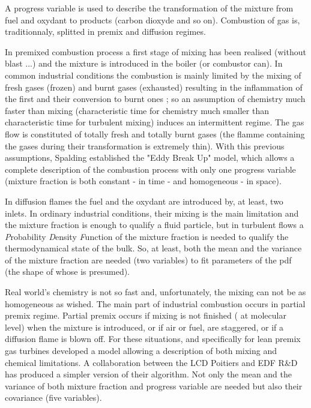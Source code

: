 A progress variable is used to describe the transformation of the mixture from
fuel and oxydant to products (carbon dioxyde and so on).
Combustion of gas is, traditionnaly, splitted in premix and diffusion regimes.

In premixed combustion process a first stage of mixing has been realised
(without blast ...) and the mixture is introduced in the boiler (or combustor
can). In common industrial conditions the combustion is mainly limited by the
mixing of fresh gases (frozen) and burnt gases (exhausted) resulting in the
inflammation of the first and their conversion to burnt ones ; so an assumption
of chemistry much faster than mixing (characteristic time for chemistry much
smaller than characteristic time for turbulent mixing) induces an intermittent
regime. The gas flow is constituted of totally fresh and totally burnt gases
(the flamme containing the gases during their transformation is extremely
thin). With this previous assumptions, Spalding \cite{Spalding:1971a} established the "Eddy
Break Up" model, which allows a complete description of the combustion process
with only one progress variable (mixture fraction is both constant
- in time - and homogeneous - in space).

In diffusion flames the fuel and the oxydant are introduced by, at least, two
inlets. In ordinary industrial conditions, their mixing is the main limitation
and the mixture fraction is enough to qualify a fluid particle, but in turbulent
flows a {\em P}robability {\em D}ensity {\em F}unction of the mixture fraction
is needed to qualify the thermodynamical state of the bulk. So, at least, both
the mean and the variance of the mixture fraction are needed (two variables) to
fit parameters of the pdf (the shape of whose is presumed).

Real world's chemistry is not so fast and, unfortunately, the mixing can not be
as homogeneous as wished. The main part of industrial combustion occurs in
partial premix regime. Partial premix occurs if mixing is not finished ( at
molecular level) when the mixture is introduced, or if air or fuel, are
staggered, or if a diffusion flame is blown off. For these situations, and
specifically for lean premix gas turbines \cite{Libby:2000a} developed a model allowing a
description of both mixing and chemical limitations. A collaboration between the
LCD Poitiers \cite{Ribert:2004a} and EDF R\&D has produced a simpler version of their
algorithm. Not only the mean and the variance of both mixture fraction and
progress variable are needed but also their covariance (five variables).
 

